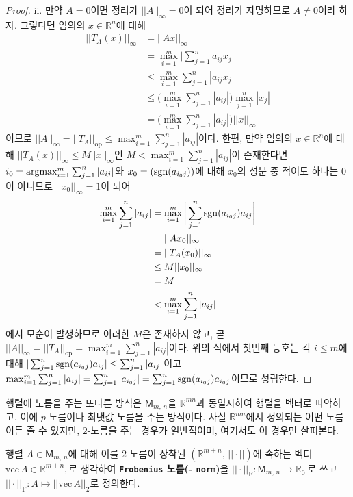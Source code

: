 \begin{proof}
    ii. 만약 $A=0$이면 정리가 $||A||_\infty=0$이 되어 정리가 자명하므로 $A\ne0$이라 하자. 그렇다면 임의의 $x\in\mathbb{R}^n$에 대해
    \begin{align*}
        ||T_A(x)||_\infty&=||Ax||_\infty\\
        &=\max_{i=1}^m\bigg|\sum_{j=1}^na_{ij}x_j\bigg|\\
        &\leq\max_{i=1}^m\sum_{j=1}^n|a_{ij}x_j|\\
        &\leq\bigg(\max_{i=1}^m\sum_{j=1}^n|a_{ij}|\bigg)\max_{j=1}^n|x_j|\\
        &=\bigg(\max_{i=1}^m\sum_{j=1}^n|a_{ij}|\bigg)||x||_\infty
    \end{align*}
    이므로 $||A||_\infty=||T_A||_\mathrm{op}\leq\max_{i=1}^m\sum_{j=1}^n|a_{ij}|$이다. 한편, 만약 임의의 $x\in\mathbb{R}^n$에 대해 $||T_A(x)||_\infty\leq M||x||_\infty$인 $M<\max_{i=1}^m\sum_{j=1}^n|a_{ij}|$이 존재한다면 $i_0=\mathrm{argmax}_{i=1}^m\sum_{j=1}^n|a_{ij}|$와 $x_0=(\mathrm{sgn}(a_{i_0j}))$에 대해 $x_0$의 성분 중 적어도 하나는 $0$이 아니므로 $||x_0||_\infty=1$이 되어
    \begin{align*}
        \max_{i=1}^m\sum_{j=1}^n|a_{ij}|&=\max_{i=1}^m\bigg|\sum_{j=1}^n\mathrm{sgn}(a_{i_0j})a_{ij}\bigg|\\
        &=||Ax_0||_\infty\\
        &=||T_A(x_0)||_\infty\\
        &\leq M||x_0||_\infty\\
        &=M\\
        &<\max_{i=1}^m\sum_{j=1}^n|a_{ij}|
    \end{align*}
    에서 모순이 발생하므로 이러한 $M$은 존재하지 않고, 곧 $||A||_\infty=||T_A||_\mathrm{op}=\max_{i=1}^m\sum_{j=1}^n|a_{ij}|$이다. 위의 식에서 첫번째 등호는 각 $i\leq m$에 대해 $|\sum_{j=1}^n\mathrm{sgn}(a_{i_0j})a_{ij}|\leq\sum_{j=1}^n|a_{ij}|$이고 $\max_{i=1}^m\sum_{j=1}^n|a_{ij}|=\sum_{j=1}^n|a_{i_0j}|=\sum_{j=1}^n\mathrm{sgn}(a_{i_0j})a_{i_0j}$이므로 성립한다.
\end{proof}

행렬에 노름을 주는 또다른 방식은 $\mathsf{M}_{m,\,n}$을 $\mathbb{R}^{mn}$과 동일시하여 행렬을 벡터로 파악하고, 이에 $p$-노름이나 최댓값 노름을 주는 방식이다. 사실 $\mathbb{R}^{mn}$에서 정의되는 어떤 노름이든 줄 수 있지만, $2$-노름을 주는 경우가 일반적이며, 여기서도 이 경우만 살펴본다.

\begin{definition}
    행렬 $A\in\mathsf{M}_{m,\,n}$에 대해 이를 $2$-노름이 장착된 $(\mathbb{R}^{m+n},\,||\cdot||)$에 속하는 벡터 $\mathrm{vec}\,A\in\mathbb{R}^{m+n},$로 생각하여 \textbf{\texttt{Frobenius} 노름(- \texttt{norm})}을 $||\cdot||_\mathrm{F}:\mathsf{M}_{m,\,n}\to\mathbb{R}_0^+$로 쓰고 $||\cdot||_\mathrm{F}:A\mapsto||\mathrm{vec}\, A||_2$로 정의한다.
\end{definition}

